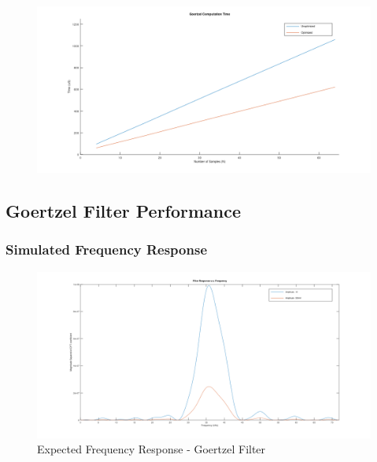\begin{figure}[H]
	\centering
	\includegraphics[width=\linewidth]{figures/results/goertzel_filter_speed/goertzel_computation_time.png}
	\label{fig:goertzel_computation_plot}
\end{figure}


\subsection{Goertzel Filter Performance}

\subsubsection{Simulated Frequency Response}


\begin{figure}[H]
	\centering
	\includegraphics[width=\linewidth]{figures/results/goertzel_filter_simulation_wide.png}
	\caption{Expected Frequency Response - Goertzel Filter}
	\label{fig:goertzel_filter_response_simulated}
\end{figure}

